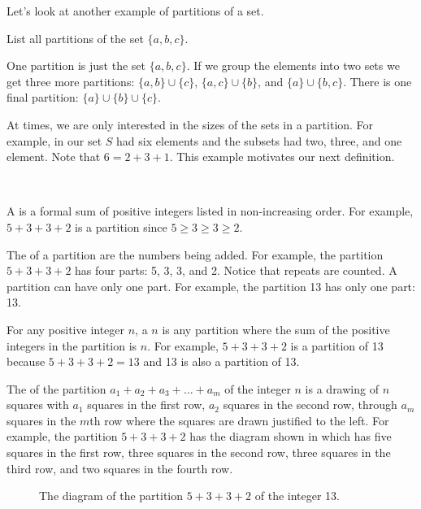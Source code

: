 Let's look at another example of partitions of a set.

\begin{exam}
\label{exam_partitions_setabc}
    List all partitions of the set $\{a,b,c\}$.
        \begin{soln}
            One partition is just the set $\{a,b,c\}$.  If we group the elements into two sets we get three more partitions:
            $\{a,b\} \cup \{c\}$, $\{a,c\} \cup \{b\}$, and $\{a\} \cup \{b,c\}$.  There is one final partition: $\{a\} \cup \{b\} \cup \{c\}$.
        \end{soln}
\end{exam}

At times, we are only interested in the sizes of the sets in a partition.  For example, in 
 our set $S$ had six elements and the subsets had two, three, and one element.  Note that $6 = 2 + 3 + 1$.  This example motivates our next definition.

 \begin{defn}
        \label{defn_partition_integer}  
        ~
            \begin{apart}
                \item A  is a formal sum of positive integers listed in non-increasing order. For example, $5+3+3+2$ is a partition since $5 \ge 3 \ge 3 \ge 2$.
                \item The  of a partition are the numbers being added.  For example, the partition $5+3+3+2$ has four parts: 5, 3, 3, and 2.  Notice that repeats are counted.  A partition can have only one part.  For example, the partition 13 has only one part: 13.
                \item For any positive integer $n$, a  $n$ is any partition where the sum of the positive integers in the partition is $n$.  For example, $5+3+3+2$ is a partition of 13 because $5+3+3+2=13$ and 13 is also a partition of 13.  
                \item The  of the partition $a_1+ a_2+a_3+\ldots +a_m$ of the integer $n$ is a drawing of $n$ squares with $a_1$ squares in the first row, $a_2$ squares in the second row,  through $a_m$ squares in the $m$th row where the squares are drawn justified to the left.  For example, the partition $5+3+3+2$ has the diagram shown in  which has five squares in the first row, three squares in the second row, three squares in the third row, and two squares in the fourth row.
                    \begin{figure} [hbtp]
                        \centering
                        \caption{The diagram of the partition $5+3+3+2$ of the integer 13.}
                        \label{fig_young_5332}
                    \end{figure}
            \end{apart}
    \end{defn}

